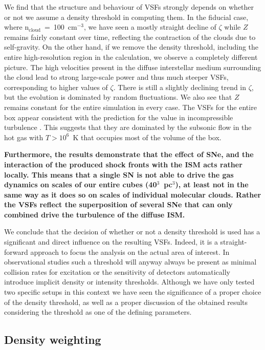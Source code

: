 We find that the structure and behaviour of VSFs strongly depends on whether or not we assume a density threshold in computing them.
In the fiducial case, where n$_\mathrm{cloud}$~=~100~cm$^{-3}$, we have seen a mostly straight decline of $\zeta$ while $Z$ remains fairly constant over time, reflecting the contraction of the clouds due to self-gravity.
On the other hand, if we remove the density threshold, including the entire high-resolution region in the calculation, we observe a completely different picture.
The high velocities present in the diffuse interstellar medium surrounding the cloud lead to strong large-scale power and thus much steeper VSFs, corresponding to higher values of $\zeta$. 
There is still a slightly declining trend in $\zeta$, but the evolution is dominated by random fluctuations.
We also see that $Z$ remains constant for the entire simulation in every case.
The VSFs for the entire box appear consistent with the prediction for the value in incompressible turbulence \citep{Boldyrev2002}. 
This suggests that they are dominated by the subsonic flow in the hot gas with $T > 10^6$~K that occupies most of the volume of the box.

\textbf{
	Furthermore, the results demonstrate that the effect of SNe, and the interaction of the produced shock fronts with the ISM acts rather locally. 
	This means that a single SN is not able to drive the gas dynamics on scales of our entire cubes (40$^3$~pc$^3$), at least not in the same way as it does so on scales of individual molecular clouds.
	Rather the VSFs reflect the superposition of several SNe that can only combined drive the turbulence of the diffuse ISM.
}

We conclude that the decision of whether or not a density threshold is used has a significant and direct influence on the resulting VSFs.
Indeed, it is a straight-forward approach to focus the analysis on the actual area of interest.
In observational studies such a threshold will anyway always be present as minimal collision rates for excitation or the sensitivity of detectors automatically introduce implicit density or intensity thresholds. 
Although we have only tested two specific setups in this context we have seen the significance of a proper choice of the density threshold, as well as a proper discussion of the obtained results considering the threshold as one of the defining parameters.




\subsection{Density weighting}\label{discussion:densweight}


